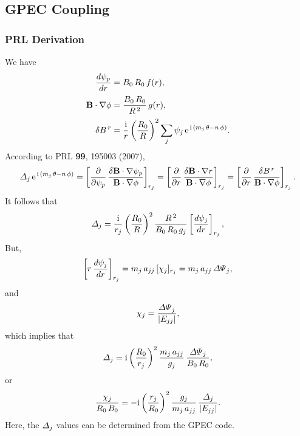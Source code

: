 \documentclass[notitlepage,12pt]{article}
\begin{document}
\subsection{GPEC Coupling}
\subsubsection{PRL Derivation}
We have
\begin{align}
\frac{d\psi_p}{dr} &= B_0\,R_0\,f(r),\\[0.5ex]
{\bf B}\cdot\nabla \phi &= \frac{B_0\,R_0}{R^{\,2}}\,g(r),\\[0.5ex]
\delta B^{\,r}&= \frac{{\rm i}}{r}\left(\frac{R_0}{R}\right)^2\sum_j \psi_j\,{\rm e}^{\,{\rm i}\,(m_j\,\theta-n\,\phi)}.
\end{align}
According to PRL {\bf 99}, 195003 (2007),
\begin{equation}
{\mit\Delta}_j\,{\rm e}^{\,{\rm i}\,(m_j\,\theta-n\,\phi)} =\left[\frac{\partial}{\partial\psi_p}\,\frac{\delta {\bf B}\cdot\nabla\psi_p}{{\bf B}\cdot\nabla\phi}\right]_{r_j}=
\left[\frac{\partial}{\partial r}\,\frac{\delta {\bf B}\cdot\nabla r}{{\bf B}\cdot\nabla\phi}\right]_{r_j} = \left[\frac{\partial}{\partial r}\,\frac{\delta B^{\,r}}{{\bf B}\cdot\nabla\phi}\right]_{r_j} .
\end{equation}
It follows that
\begin{equation}
{\mit\Delta}_j = \frac{{\rm i}}{r_j}\left(\frac{R_0}{R}\right)^2\frac{R^{\,2}}{B_0\,R_0\,g_j}\left[\frac{d\psi_j}{dr}\right]_{r_j},
\end{equation}
But,
\begin{equation}
\left[r\,\frac{d\psi_j}{dr}\right]_{r_j} = m_j\,a_{jj}\,[\chi_j]_{r_j} =  m_j\,a_{jj}\,{\mit\Delta\Psi}_j,
\end{equation}
and
\begin{equation}
\chi_j =\frac{{\mit\Delta\Psi}_j}{|E_{jj}|},
\end{equation}
which implies that
\begin{align}
{\mit\Delta}_j ={\rm i}\left(\frac{R_0}{r_j}\right)^2 \frac{m_j\,a_{jj}}{g_j}\,\frac{{\mit\Delta\Psi}_j}{B_0\,R_0},
\end{align}
or
\begin{align}
\frac{\chi_j}{R_0\,B_0} = -{\rm i}\left(\frac{r_j}{R_0}\right)^2 \frac{g_j}{m_j\,a_{jj}}\,\frac{{\mit\Delta}_j}{|E_{jj}|}.
\end{align}
Here, the ${\mit\Delta}_j$ values can be determined from the GPEC code. 
\end{document}
